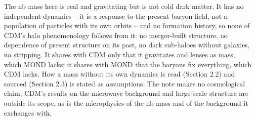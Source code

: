 \documentclass[
  10pt,
]{article}
\begin{document}
The nb mass here is real and gravitating but is not cold dark matter. It
has no independent dynamics -- it is a response to the present baryon
field, not a population of particles with its own orbits -- and no
formation history, so none of CDM's halo phenomenology follows from it:
no merger-built structure, no dependence of present structure on its
past, no dark sub-haloes without galaxies, no stripping. It shares with
CDM only that it gravitates and lenses as mass, which MOND lacks; it
shares with MOND that the baryons fix everything, which CDM lacks. How a
mass without its own dynamics is read (Section 2.2) and sourced (Section
2.3) is stated as assumptions. The note makes no cosmological claim;
CDM's results on the microwave background and large-scale structure are
outside its scope, as is the microphysics of the nb mass and of the background it exchanges with.
\end{document}
